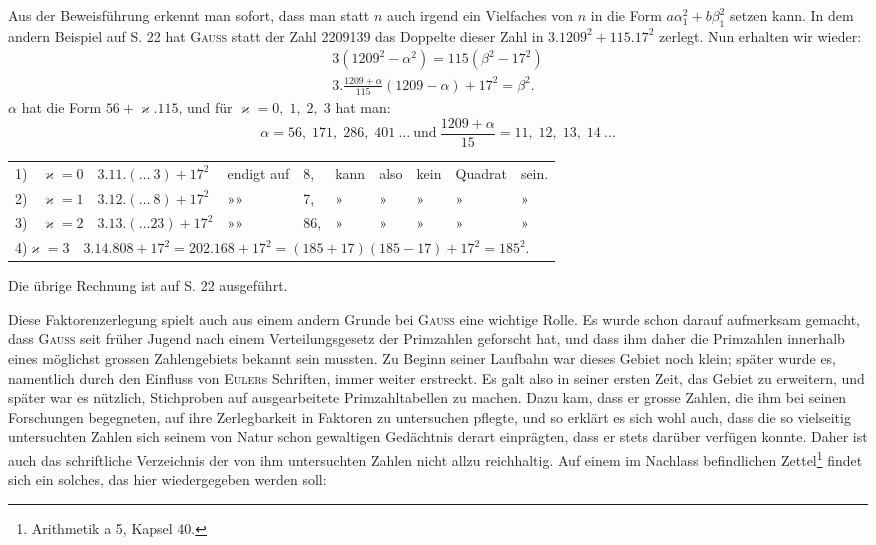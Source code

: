 Aus der Beweisführung erkennt man sofort, dass man statt $n$ auch irgend
ein Vielfaches von $n$ in die Form $a\alpha_1^2+b\beta_1^2$ setzen kann. In dem andern
Beispiel auf S. 22 hat \textsc{Gauss} statt der Zahl 2209139 das Doppelte dieser
Zahl in $3\mathord{.}1209^2+115\mathord{.}17^2$ zerlegt. Nun erhalten wir wieder:
\[
\begin{gathered}
3(1209^2-\alpha^2)=115(\beta^2-17^2)\\
3\mathord{.}\frac{1209+\alpha}{115}(1209-\alpha)+17^2=\beta^2.
\end{gathered}
\]
\noindent $\alpha$ hat die Form $56+\varkappa\mathord{.}115$, und für $\varkappa=0,\;1,\;2,\;3$ hat man:
\[
\alpha=56,\;171,\;286,\;401\ \ldots\ \text{und}\ \frac{1209+\alpha}{15}=11,\;12,\;13,\;14\ \ldots
\]
\begingroup\footnotesize\setlength{\tabcolsep}{2.5pt}
\begin{center}
\begin{tabular}{rlllllllll}
1)&$\varkappa=0$&$3\mathord{.}11\mathord{.}(\ldots\ 3)+17^2$&endigt auf&8,&kann&also&kein&Quadrat&sein.\\
2)&$\varkappa=1$&$3\mathord{.}12\mathord{.}(\ldots\ 8)+17^2$&»\quad »&7,&»&»&»&»&»\\
3)&$\varkappa=2$&$3\mathord{.}13\mathord{.}(\ldots23)+17^2$&»\quad »&86,&»&»&»&»&»\\
\multicolumn{10}{l}{4)\quad $\varkappa=3\quad 3\mathord{.}14\mathord{.}808+17^2=202\mathord{.}168+17^2=(185+17)(185-17)+17^2=185^2.$}
\end{tabular}
\end{center}
\endgroup
\noindent Die übrige Rechnung ist auf S. 22 ausgeführt.

Diese Faktorenzerlegung spielt auch aus einem andern Grunde bei \textsc{Gauss}
eine wichtige Rolle. Es wurde schon darauf aufmerksam gemacht, dass \textsc{Gauss}
seit früher Jugend nach einem Verteilungsgesetz der Primzahlen geforscht
hat, und dass ihm daher die Primzahlen innerhalb eines möglichst grossen
Zahlengebiets bekannt sein mussten. Zu Beginn seiner Laufbahn war dieses
\clearpage{}
\setcounter{footnote}{0}
\noindent Gebiet noch klein; später wurde es, namentlich durch den Einfluss von \textsc{Euler}s
Schriften, immer weiter erstreckt. Es galt also in seiner ersten Zeit, das
Gebiet zu erweitern, und später war es nützlich, Stichproben auf ausgearbeitete
Primzahltabellen zu machen. Dazu kam, dass er grosse Zahlen, die ihm bei
seinen Forschungen begegneten, auf ihre Zerlegbarkeit in Faktoren zu untersuchen pflegte, und so erklärt es sich wohl auch, dass die so vielseitig untersuchten Zahlen sich seinem von Natur schon gewaltigen Gedächtnis derart
einprägten, dass er stets darüber verfügen konnte. Daher ist auch das schriftliche Verzeichnis der von ihm untersuchten Zahlen nicht allzu reichhaltig.
Auf einem im Nachlass befindlichen Zettel\footnote{Arithmetik a 5, Kapsel 40.} findet sich ein solches, das hier
wiedergegeben werden soll:

